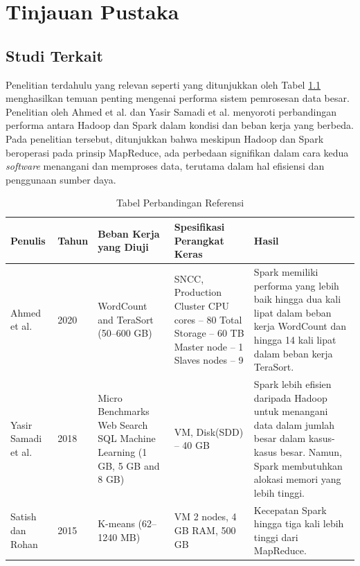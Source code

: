 \chapter{Tinjauan Pustaka}

\section{Studi Terkait}

Penelitian terdahulu yang relevan seperti yang ditunjukkan oleh Tabel \ref{table:penelitian-terdahulu} menghasilkan temuan penting mengenai performa sistem pemrosesan data besar. Penelitian oleh Ahmed et al. \cite{ahmedComprehensivePerformanceAnalysis2020} dan Yasir Samadi et al. \cite{samadiPerformanceComparisonHadoop2018} menyoroti perbandingan performa antara Hadoop dan Spark dalam kondisi dan beban kerja yang berbeda. Pada penelitian tersebut, ditunjukkan bahwa meskipun Hadoop dan Spark beroperasi pada prinsip MapReduce, ada perbedaan signifikan dalam cara kedua \textit{software} menangani dan memproses data, terutama dalam hal efisiensi dan penggunaan sumber daya. 

\begin{table}[!htbp]
\centering
\caption{Tabel Perbandingan Referensi}
\label{table:penelitian-terdahulu}
\begin{tabular}{|p{1.5cm}|p{1.25cm}|p{2.75cm}|p{3cm}|p{4cm}|}
\hline
\textbf{Penulis} & \textbf{Tahun} & \textbf{Beban Kerja yang Diuji} & \textbf{Spesifikasi Perangkat Keras} & \textbf{Hasil} \\
\hline
Ahmed et al. \cite{ahmedComprehensivePerformanceAnalysis2020} & 2020 & WordCount and TeraSort (50--600 GB) & SNCC, Production Cluster CPU cores -- 80 Total Storage -- 60 TB Master node -- 1 Slaves nodes -- 9 & Spark memiliki performa yang lebih baik hingga dua kali lipat dalam beban kerja WordCount dan hingga 14 kali lipat dalam beban kerja TeraSort. \\
\hline
Yasir Samadi et al. \cite{samadiPerformanceComparisonHadoop2018} & 2018 & Micro Benchmarks Web Search SQL Machine Learning (1 GB, 5 GB and 8 GB) & VM, Disk(SDD) -- 40 GB & Spark lebih efisien daripada Hadoop untuk menangani data dalam jumlah besar dalam kasus-kasus besar. Namun, Spark membutuhkan alokasi memori yang lebih tinggi. \\
\hline
Satish dan Rohan \cite{gopalaniComparingApacheSpark2015} & 2015 & K-means (62--1240 MB) & VM 2 nodes, 4 GB RAM, 500 GB & Kecepatan Spark hingga tiga kali lebih tinggi dari MapReduce. \\
\hline
\end{tabular}
\end{table}

